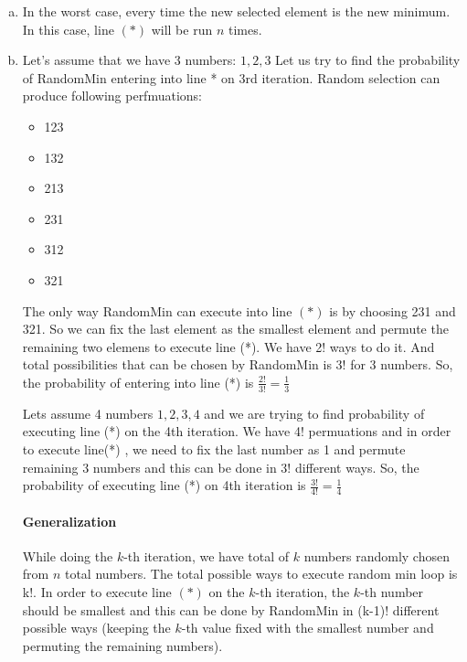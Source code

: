

\begin{enumerate}[(a)]

	\item In the worst case, every time the new selected element is the new minimum. In this case, line $(*)$ will be run $n$ times.
	
	
	\item 
	
	Let’s assume that we have 3 numbers: $1,2,3$
	Let us try to find the probability of RandomMin entering into line * on 3rd iteration.
	Random selection can produce following perfmuations:
	
	\begin{itemize}
	
		\item 123
		\item 132
		\item 213
		\item 231
		\item 312
		\item 321
		
	\end{itemize}
	
	The only way RandomMin can execute into line $(*)$ is by choosing 231 and 321. 
	So we can fix the last element as the smallest element and permute the remaining two elemens to execute line (*). 
	We have 2! ways to do it. And total possibilities that can be chosen by RandomMin is 3! for 3 numbers. 
	So, the probability of entering into line (*) is  $\frac{2!}{3!} = \frac{1}{3} $
	
	Lets assume 4 numbers $1, 2, 3, 4$ and we are trying to find probability of executing line (*) on the 4th iteration. 
	We have 4! permuations and in order to execute line(*) , we need to fix the last number as 1 and permute remaining 3 numbers and this can be done in 3! different ways. 
	So, the probability of executing line (*) on 4th iteration is $\frac{3!}{4!} = \frac{1}{4}$

	\paragraph{Generalization}
	
	While doing the $k$-th iteration, we have total of $k$ numbers randomly chosen from $n$ total numbers. 
	The total possible ways to execute random min loop is k!. 
	In order to execute line $(*)$ on the $k$-th iteration, the $k$-th number should be smallest and this can be done by RandomMin in (k-1)! different possible ways (keeping the  $k$-th value fixed with the smallest number and permuting  the remaining numbers).


\end{enumerate}
